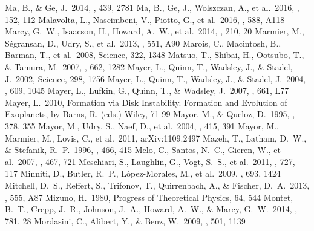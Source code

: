 \documentclass[twocolumn]{aastex62}
\begin{document}
\begin{CJK*}{UTF8}{min}
\begin{thebibliography}{}
 Ma, B., \& Ge, J.\ 2014, \mnras, 439, 2781
 Ma, B., Ge, J., Wolszczan, A., et al.\ 2016, \aj, 152, 112
 Malavolta, L., Nascimbeni, V., Piotto, G., et al.\ 2016, \aap, 588, A118
 Marcy, G.~W., Isaacson, H., Howard, A.~W., et al.\ 2014, \apjs, 210, 20
 Marmier, M., S{\'e}gransan, D., Udry, S., et al.\ 2013, \aap, 551, A90
 Marois, C., Macintosh, B., Barman, T., et al.\ 2008, Science, 322, 1348
 Matsuo, T., Shibai, H., Ootsubo, T., \& Tamura, M.\ 2007, \apj, 662, 1282
 Mayer, L., Quinn, T., Wadsley, J., \& Stadel, J.\ 2002, Science, 298, 1756
 Mayer, L., Quinn, T., Wadsley, J., \& Stadel, J.\ 2004, \apj, 609, 1045
 Mayer, L., Lufkin, G., Quinn, T., \& Wadsley, J.\ 2007, \apjl, 661, L77
 Mayer, L.\ 2010, Formation via Disk Instability. Formation and Evolution of Exoplanets, by Barns, R. (eds.) Wiley, 71-99
 Mayor, M., \& Queloz, D.\ 1995, \nat, 378, 355
 Mayor, M., Udry, S., Naef, D., et al.\ 2004, \aap, 415, 391
 Mayor, M., Marmier, M., Lovis, C., et al.\ 2011, arXiv:1109.2497
 Mazeh, T., Latham, D.~W., \& Stefanik, R.~P.\ 1996, \apj, 466, 415
 Melo, C., Santos, N.~C., Gieren, W., et al.\ 2007, \aap, 467, 721
 Meschiari, S., Laughlin, G., Vogt, S.~S., et al.\ 2011, \apj, 727, 117
 Minniti, D., Butler, R.~P., L{\'o}pez-Morales, M., et al.\ 2009, \apj, 693, 1424
 Mitchell, D.~S., Reffert, S., Trifonov, T., Quirrenbach, A., \& Fischer, D.~A.\ 2013, \aap, 555, A87
 Mizuno, H.\ 1980, Progress of Theoretical Physics, 64, 544
 Montet, B.~T., Crepp, J.~R., Johnson, J.~A., Howard, A.~W., \& Marcy, G.~W.\ 2014, \apj, 781, 28
 Mordasini, C., Alibert, Y., \& Benz, W.\ 2009, \aap, 501, 1139

\end{thebibliography}
\end{CJK*}
\end{document}
